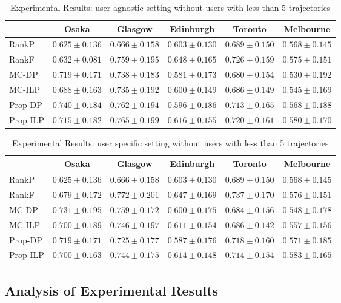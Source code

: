\begin{table*}
\centering
\caption{Experimental Results: user agnostic setting without users with less than 5 trajectories}
\begin{tabular}{l|ccccc} \hline
 & Osaka & Glasgow & Edinburgh & Toronto & Melbourne \\ \hline
RankP & $0.625\pm0.136$ & $0.666\pm0.158$ & $0.603\pm0.130$ & $0.689\pm0.150$ & $0.568\pm0.145$ \\
RankF & $0.632\pm0.081$ & $0.759\pm0.195$ & $\mathbf{0.648\pm0.165}$ & $\mathbf{0.726\pm0.159}$ & $0.575\pm0.151$ \\
MC-DP & $0.719\pm0.171$ & $0.738\pm0.183$ & $0.581\pm0.173$ & $0.680\pm0.154$ & $0.530\pm0.192$ \\
MC-ILP & $0.688\pm0.163$ & $0.735\pm0.192$ & $0.600\pm0.149$ & $0.686\pm0.149$ & $0.545\pm0.169$ \\
Prop-DP & $\mathbf{0.740\pm0.184}$ & $0.762\pm0.194$ & $0.596\pm0.186$ & $0.713\pm0.165$ & $0.568\pm0.188$ \\
Prop-ILP & $0.715\pm0.182$ & $\mathbf{0.765\pm0.199}$ & $0.616\pm0.155$ & $0.720\pm0.161$ & $\mathbf{0.580\pm0.170}$ \\
\hline
\end{tabular}
\end{table*}

\begin{table*}
\centering
\caption{Experimental Results: user specific setting without users with less than 5 trajectories}
\begin{tabular}{l|ccccc} \hline
 & Osaka & Glasgow & Edinburgh & Toronto & Melbourne \\ \hline
RankP & $0.625\pm0.136$ & $0.666\pm0.158$ & $0.603\pm0.130$ & $0.689\pm0.150$ & $0.568\pm0.145$ \\
RankF & $0.679\pm0.172$ & $\mathbf{0.772\pm0.201}$ & $\mathbf{0.647\pm0.169}$ & $\mathbf{0.737\pm0.170}$ & $0.576\pm0.151$ \\
MC-DP & $\mathbf{0.731\pm0.195}$ & $0.759\pm0.172$ & $0.600\pm0.175$ & $0.684\pm0.156$ & $0.548\pm0.178$ \\
MC-ILP & $0.700\pm0.189$ & $0.746\pm0.197$ & $0.611\pm0.154$ & $0.686\pm0.142$ & $0.557\pm0.156$ \\
Prop-DP & $0.719\pm0.171$ & $0.725\pm0.177$ & $0.587\pm0.176$ & $0.718\pm0.160$ & $0.571\pm0.185$ \\
Prop-ILP & $0.700\pm0.163$ & $0.744\pm0.175$ & $0.614\pm0.148$ & $0.714\pm0.154$ & $\mathbf{0.583\pm0.165}$ \\
\hline
\end{tabular}
\end{table*}


\subsection{Analysis of Experimental Results}
\label{experiment:analysis}
